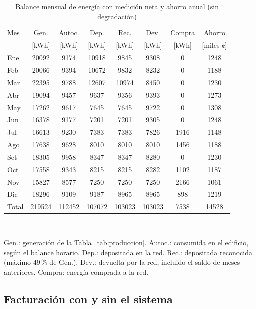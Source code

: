 \begin{table}[!htb]
\caption{Balance mensual de energía con medición neta y ahorro anual (sin degradación)}
\label{tab:balance}
\centering
\footnotesize
\setlength{\tabcolsep}{1.1pt}
\begin{tabular}{l S[table-format=6.0] S[table-format=6.0] S[table-format=6.0] S[table-format=6.0] S[table-format=6.0] S[table-format=4.0] S[table-format=5.0]}
\toprule
{Mes} & {Gen.} & {Autoc.} & {Dep.} & {Rec.} & {Dev.} & {Compra} & {Ahorro} \\
 & {[kWh]} & {[kWh]} & {[kWh]} & {[kWh]} & {[kWh]} & {[kWh]} & {[miles ¢]} \\
\midrule
Ene & 20092 & 9174 & 10918 & 9845 & 9308 & 0 & 1248 \\
Feb & 20066 & 9394 & 10672 & 9832 & 8232 & 0 & 1188 \\
Mar & 22395 & 9788 & 12607 & 10974 & 8450 & 0 & 1230 \\
Abr & 19094 & 9457 & 9637 & 9356 & 9393 & 0 & 1273 \\
May & 17262 & 9617 & 7645 & 7645 & 9722 & 0 & 1308 \\
Jun & 16378 & 9177 & 7201 & 7201 & 9305 & 0 & 1248 \\
Jul & 16613 & 9230 & 7383 & 7383 & 7826 & 1916 & 1148 \\
Ago & 17638 & 9628 & 8010 & 8010 & 8010 & 1456 & 1188 \\
Set & 18305 & 9958 & 8347 & 8347 & 8280 & 0 & 1230 \\
Oct & 17558 & 9343 & 8215 & 8215 & 8282 & 1102 & 1187 \\
Nov & 15827 & 8577 & 7250 & 7250 & 7250 & 2166 & 1061 \\
Dic & 18296 & 9109 & 9187 & 8965 & 8965 & 898 & 1219 \\
\midrule
Total & 219524 & 112452 & 107072 & 103023 & 103023 & 7538 & 14528 \\
\bottomrule
\end{tabular}
\\[2pt]
\parbox{\columnwidth}{\footnotesize Gen.: generación de la Tabla~\ref{tab:produccion}. Autoc.: consumida en el edificio, según el balance horario. Dep.: depositada en la red. Rec.: depositada reconocida (máximo 49\,\% de Gen.). Dev.: devuelta por la red, incluido el saldo de meses anteriores. Compra: energía comprada a la red.}
\end{table}

\subsection{Facturación con y sin el sistema}

